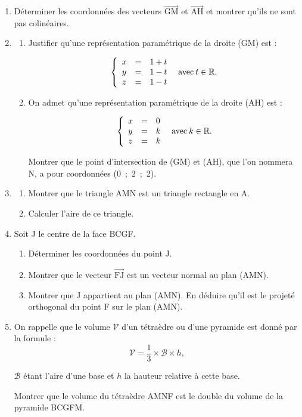 \documentclass[10pt]{article}
\providecommand{\R}{\mathbb{R}}
\providecommand{\vect}[1]{\overrightarrow{#1}}
\begin{document}
\begin{enumerate}
\item Déterminer les coordonnées des vecteurs $\vect{\text{GM}}$ et $\vect{\text{AH}}$ et montrer qu'ils ne sont pas colinéaires.
\item
	\begin{enumerate}
		\item Justifier qu'une représentation paramétrique de la droite (GM) est :

\[\left\{\begin{array}{l c l}
x&=&1 + t\\
y&=&1 - t\\
z&=&1 - t
\end{array}\right. \:\text{ avec}\: t \in \R.\]

		\item On admet qu'une représentation paramétrique de la droite (AH) est :

\[\left\{\begin{array}{l c l}
x&=&0\\
y&=&k\\
z&=&k
\end{array}\right. \:\text{ avec}\: k \in \R.\]

Montrer que le point d'intersection de (GM) et (AH), que l'on nommera N, a pour
coordonnées (0~;~2~;~2).
	\end{enumerate}
\item
	\begin{enumerate}
		\item Montrer que le triangle AMN est un triangle rectangle en A.
		\item Calculer l'aire de ce triangle.
	\end{enumerate}
\item Soit J le centre de la face BCGF{}.
	\begin{enumerate}
		\item Déterminer les coordonnées du point J.
		\item Montrer que le vecteur $\vect{\text{FJ}}$ est un vecteur normal au plan (AMN).
		\item Montrer que J appartient au plan (AMN). En déduire qu'il est le projeté orthogonal du point F sur le plan (AMN).
	\end{enumerate}
\item On rappelle que le volume $\mathcal{V}$ d'un tétraèdre ou d'une pyramide est donné par la formule :
\[\mathcal{V} = \dfrac13 \times \mathcal{B} \times h,\]

$\mathcal{B}$ étant l'aire d'une base et $h$ la hauteur relative à cette base.

Montrer que le volume du tétraèdre AMNF est le double du volume de la pyramide BCGFM.
\end{enumerate}

\bigskip
\end{document}
